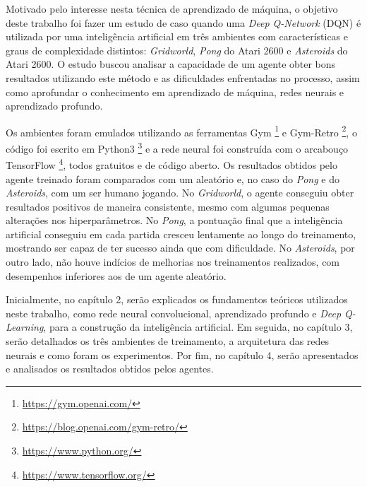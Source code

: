 Motivado pelo interesse nesta técnica de aprendizado de máquina, o objetivo deste trabalho foi fazer um estudo de caso quando uma \textit{Deep Q-Network} (DQN) é utilizada por uma inteligência artificial em três ambientes com características e graus de complexidade distintos: \textit{Gridworld}, \textit{Pong} do Atari 2600 e \textit{Asteroids} do Atari 2600.
O estudo buscou analisar a capacidade de um agente obter bons resultados utilizando este método e as dificuldades enfrentadas no processo, assim como aprofundar o conhecimento em aprendizado de máquina, redes neurais e aprendizado profundo.

Os ambientes foram emulados utilizando as ferramentas Gym \footnote{\url{https://gym.openai.com/}} e Gym-Retro \footnote{\url{https://blog.openai.com/gym-retro/}}, o código foi escrito em Python3 \footnote{\url{https://www.python.org/}} e a rede neural foi construída com o arcabouço TensorFlow \footnote{\url{https://www.tensorflow.org/}}, todos gratuitos e de código aberto.
Os resultados obtidos pelo agente treinado foram comparados com um aleatório e, no caso do \textit{Pong} e do \textit{Asteroids}, com um ser humano jogando.
No \textit{Gridworld}, o agente conseguiu obter resultados positivos de maneira consistente, mesmo com algumas pequenas alterações nos hiperparâmetros.
No \textit{Pong}, a pontuação final que a inteligência artificial conseguiu em cada partida cresceu lentamente ao longo do treinamento, mostrando ser capaz de ter sucesso ainda que com dificuldade.
No \textit{Asteroids}, por outro lado, não houve indícios de melhorias nos treinamentos realizados, com desempenhos inferiores aos de um agente aleatório.

Inicialmente, no capítulo 2, serão explicados os fundamentos teóricos utilizados neste trabalho, como rede neural convolucional, aprendizado profundo e \textit{Deep Q-Learning}, para a construção da inteligência artificial.
Em seguida, no capítulo 3, serão detalhados os três ambientes de treinamento, a arquitetura das redes neurais e como foram os experimentos.
Por fim, no capítulo 4, serão apresentados e analisados os resultados obtidos pelos agentes.
